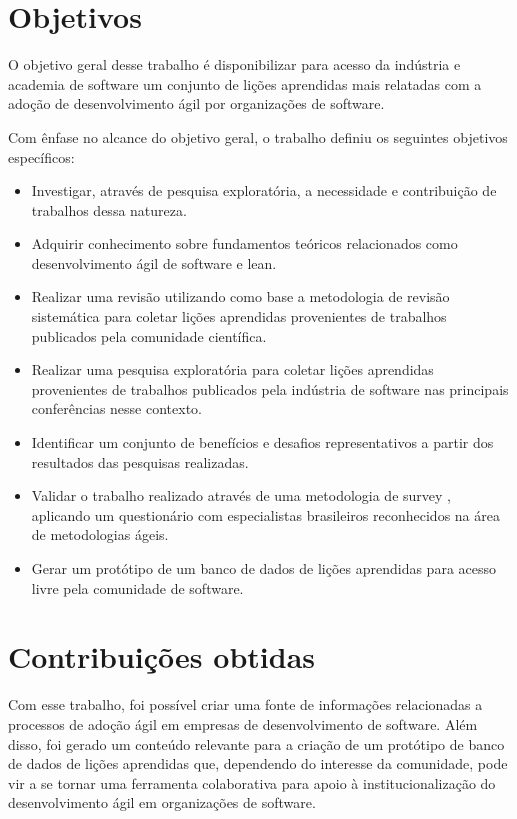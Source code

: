 \section{Objetivos} 

O objetivo geral desse trabalho é disponibilizar para acesso da indústria e academia de software um conjunto de lições aprendidas mais relatadas com a adoção de desenvolvimento ágil por organizações de software.

Com ênfase no alcance do objetivo geral, o trabalho definiu os seguintes objetivos específicos:

\begin{itemize}
	\item Investigar, através de pesquisa exploratória, a necessidade e contribuição de trabalhos dessa natureza.
	\item Adquirir conhecimento sobre fundamentos teóricos relacionados como desenvolvimento ágil de software e lean.
	\item Realizar uma revisão utilizando como base a metodologia de revisão sistemática \cite{Barbara04} para coletar lições aprendidas provenientes de trabalhos publicados pela comunidade científica.
	\item Realizar uma pesquisa exploratória para coletar lições aprendidas provenientes de trabalhos publicados pela indústria de software nas principais conferências nesse contexto.
	\item Identificar um conjunto de benefícios e desafios representativos a partir dos resultados das pesquisas realizadas.
	\item Validar o trabalho realizado através de uma metodologia de survey \cite{Babbie1990}, aplicando um questionário com especialistas brasileiros reconhecidos na área de metodologias ágeis.
	\item Gerar um protótipo de um banco de dados de lições aprendidas para acesso livre pela comunidade de software.
\end{itemize}

\section{Contribuições obtidas}

Com esse trabalho, foi possível criar uma fonte de informações relacionadas a processos de adoção ágil em empresas de desenvolvimento de software. Além disso, foi gerado um conteúdo relevante para a criação de um protótipo de banco de dados de lições aprendidas que, dependendo do interesse da comunidade, pode vir a se tornar uma ferramenta colaborativa para apoio à institucionalização do desenvolvimento ágil em organizações de software.

